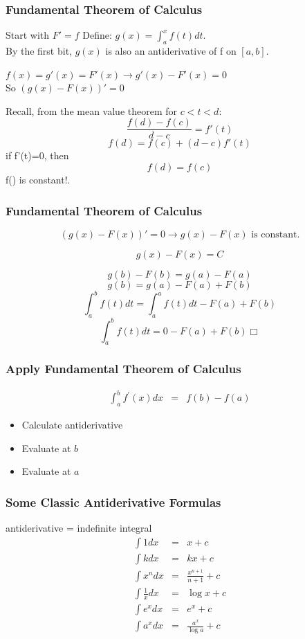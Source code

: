 \documentclass{beamer}
\numberwithin{equation}{section}
\begin{document}
\begin{frame}
\frametitle{Fundamental Theorem of Calculus}
Start with $F'=f$
Define: $g(x)=\int_a^x f(t)dt$.\\
By the first bit, $g(x)$ is also an antiderivative of f on $[a,b]$.\pause

$f(x)=g'(x)=F'(x)\rightarrow g'(x)-F'(x)=0$\\\pause
So $(g(x)-F(x))'=0$\pause

Recall, from the mean value theorem for $c<t<d$:
$$\frac{f(d)-f(c)}{d-c}=f'(t)$$\pause
$$f(d)=f(c)+(d-c)f'(t)$$\pause
if f'(t)=0, then 
$$f(d)=f(c)$$
f() is constant!.
\end{frame}

\begin{frame}
\frametitle{Fundamental Theorem of Calculus}
$$(g(x)-F(x))'=0 \rightarrow g(x)-F(x) \text{  is constant.}$$

$$g(x)-F(x) =C$$

$$g(b)-F(b)= g(a)-F(a)$$ \pause
$$g(b)= g(a)-F(a)+F(b)$$ \pause
$$\int_a^bf(t)dt =\int_a^af(t)dt-F(a)+F(b)$$\pause
$$\int_a^bf(t)dt =0-F(a)+F(b)\Box$$

\end{frame}



\begin{frame}
\frametitle{Apply Fundamental Theorem of Calculus}

\begin{eqnarray}
\int_{a}^{b} f^{'} (x) dx & = & f(b) - f(a) \nonumber 
\end{eqnarray} 

\begin{itemize}
\item[-] Calculate \alert{antiderivative}
\item[-] Evaluate at $b$
\item[-] Evaluate at $a$
\end{itemize}

\end{frame}



\begin{frame}
\frametitle{Some Classic Antiderivative Formulas} 

\alert{antiderivative} = \alert{indefinite integral}
\begin{eqnarray}
\int 1 dx & = &  x + c \nonumber \\
\int k dx & = & k x + c \nonumber \\
\int x^{n} dx & = & \frac{x^{n+1}}{n + 1} + c \nonumber \\
\int \frac{1}{x} dx & = & \log x + c \nonumber \\
\int e^{x} dx  & = & e^{x} + c \nonumber \\
\int a^{x} dx & = & \frac{a^{x} } {\log a }  + c \nonumber 
\end{eqnarray}

\end{frame}
\end{document}
